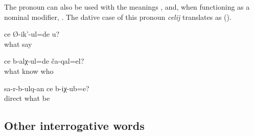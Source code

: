 The pronoun    can also be used with the meanings  ,   and, when functioning as a nominal modifier, . The dative case of this pronoun \textit{celij} translates as  ().
%
\begin{exe}
	\ex	\label{ex:What do you (masc.) say}
	\gll	ce	Ø-ik'-ul=de	u?\\
		what	say	\\
	\glt	{}

	\ex	\label{ex:How do you know who they are}
	\gll	ce	b-alχ-ul=de	ča-qal=el?\\
		what	know	who\\
	\glt	{}

	\ex	\label{ex:(The picture on which the people) run away, where is it}
	\gll	sa-r-b-ulq-an	ce	b-iχ-ub=e?\\
		direct	what	be\\
	\glt	{}
\end{exe}



\subsection{Other interrogative words}
\label{ssec:Other interrogative pronouns}



\subsubsection{ }
\label{sssec:cina where}

